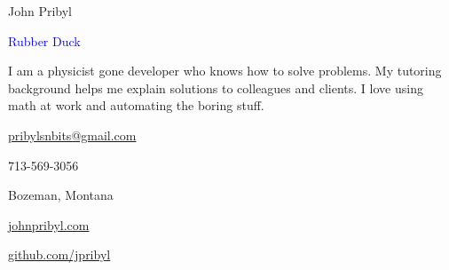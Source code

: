 \documentclass[12pt]{resume}
\begin{document}
    \noindent\begin{minipage}[t]{0.63\textwidth}
        {\par \huge John Pribyl}
        {\par \large \textcolor{blue}{Rubber Duck}}
        \vspace{4pt}
        {\par I am a physicist gone developer who knows how to solve problems.
        My tutoring background helps me explain solutions to colleagues and
        clients. I love using math at work and automating the boring stuff.}
    \end{minipage}
    \begin{minipage}[t]{0.35\textwidth}
        \begin{flushright}
            {\par \textcolor{black}{\href{mailto:pribylsnbits@gmail.com}{pribylsnbits@gmail.com}}}
            {\par 713-569-3056}
            {\par Bozeman, Montana}
            {\par \textcolor{lavender}{\underline{\href{https://www.johnpribyl.com}{johnpribyl.com}}}}
            {\par \textcolor{lavender}{\underline{\href{https://www.github.com/jpribyl}{github.com/jpribyl}}}}
        \end{flushright}
    \end{minipage}
    \begin{minipage}[t]{0.03\textwidth}
        \begin{center}
            {\par \textcolor{black}\faEnvelope} 
            {\par \faMobile} 
            {\par \faMapMarker} 
            {\par \textcolor{lavender}\faGlobe} 
            {\par \textcolor{lavender}\faGithub} 
        \end{center}
    \end{minipage}
    \\
    \\
    \makebox[\linewidth]{\rule{\paperwidth}{0.2pt}}
\end{document}
